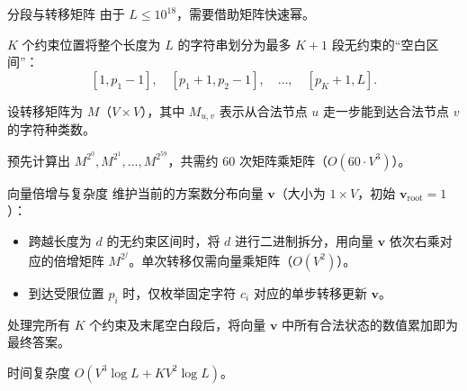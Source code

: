 \documentclass{beamer}
\begin{document}
{\begin{frame}{分段与转移矩阵}
  由于 $L\le 10^{18}$，需要借助矩阵快速幂。

  \vspace{0.5em}
  $K$ 个约束位置将整个长度为 $L$ 的字符串划分为最多 $K+1$ 段无约束的“空白区间”：
  \[
    [1,p_1-1],\quad [p_1+1,p_2-1],\quad \ldots,\quad [p_K+1,L].
  \]

  \vspace{0.5em}
  设转移矩阵为 $M$（$V\times V$），其中 $M_{u,v}$ 表示从合法节点 $u$ 走一步能到达合法节点 $v$ 的字符种类数。

  \vspace{0.5em}
  预先计算出 $M^{2^0},M^{2^1},\ldots,M^{2^{59}}$，共需约 $60$ 次矩阵乘矩阵（$O(60\cdot V^3)$）。
\end{frame}

\begin{frame}{向量倍增与复杂度}
  维护当前的方案数分布向量 $\mathbf{v}$（大小为 $1\times V$，初始 $\mathbf{v}_{\text{root}}=1$）：

  \begin{itemize}
    \item 跨越长度为 $d$ 的无约束区间时，将 $d$ 进行二进制拆分，用向量 $\mathbf{v}$ 依次右乘对应的倍增矩阵 $M^{2^j}$。单次转移仅需向量乘矩阵（$O(V^2)$）。
    \item 到达受限位置 $p_i$ 时，仅枚举固定字符 $c_i$ 对应的单步转移更新 $\mathbf{v}$。
  \end{itemize}

  处理完所有 $K$ 个约束及末尾空白段后，将向量 $\mathbf{v}$ 中所有合法状态的数值累加即为最终答案。

  \vspace{0.5em}
  时间复杂度 $O(V^3\log L + K V^2\log L)$。
\end{frame}}
\end{document}
